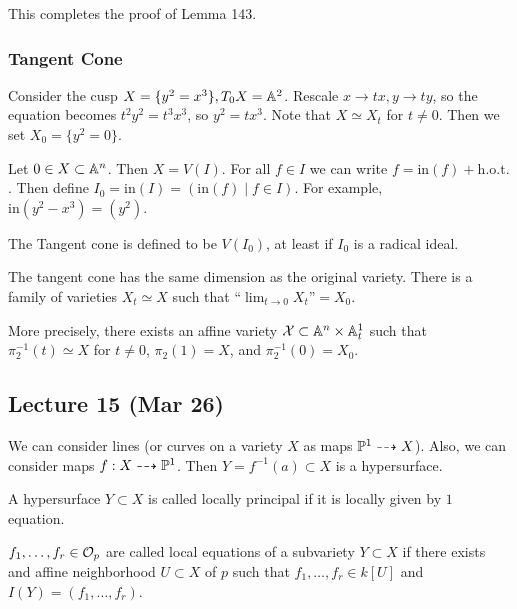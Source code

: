 \documentclass[twoside, 10pt]{article}
\begin{document}
    This completes the proof of Lemma 143.

    \subsubsection{Tangent Cone} Consider the cusp $X = \{y^2 = x^3\}, T_0 X =
    \A^2$. Rescale $x \to tx, y \to ty$, so the equation becomes $t^2y^2 =
    t^3x^3$, so $y^2 = tx^3$. Note that $X \simeq X_t$ for $t \neq 0$. Then we
    set $X_0 = \{y^2 = 0\}$.

    Let $0 \in X \subset \A^n$. Then $X = V(I)$. For all $f \in I$ we can write
    $f = \mathrm{in}(f) + \mathrm{h.o.t.}$. Then define $I_0 = \mathrm{in}(I) =
    (\mathrm{in}(f) \mid f \in I)$. For example, $\mathrm{in}(y^2-x^3) =
    (y^2)$. 

    \begin{defn} The Tangent cone is defined to be $V(I_0)$, at least if $I_0$
    is a radical ideal.  \end{defn}

    \begin{thm} The tangent cone has the same dimension as the original
    variety. There is a family of varieties $X_t \simeq X$ such that ``$\lim_{t
\to 0} X_t$''$= X_0$.  \end{thm}

    More precisely, there exists an affine variety $\mc{X} \subset \A^n \times
    \A^1_t$ such that $\pi_2^{-1}(t) \simeq X$ for $t \neq 0$, $\pi_2(1) = X$,
    and $\pi_2^{-1}(0) = X_0$.

    \subsection{Lecture 15 (Mar 26)} We can consider lines (or curves on a
    variety $X$ as maps $\P^1 \dashrightarrow X$). Also, we can consider maps
    $f: X \dashrightarrow \P^1$. Then $Y = f^{-1}(a) \subset X$ is a
    hypersurface.

    \begin{defn} A hypersurface $Y \subset X$ is called
    locally principal if it is locally given by $1$ equation.  \end{defn}

    \begin{defn} $f_1, \ldots, f_r \in \mc{O}_p$ are called
        local equations of a subvariety $Y \subset X$ if there exists and
        affine neighborhood $U \subset X$ of $p$ such that $f_1, \ldots, f_r
        \in k[U]$ and $I(Y) = (f_1, \ldots, f_r)$.  \end{defn}
\end{document}
